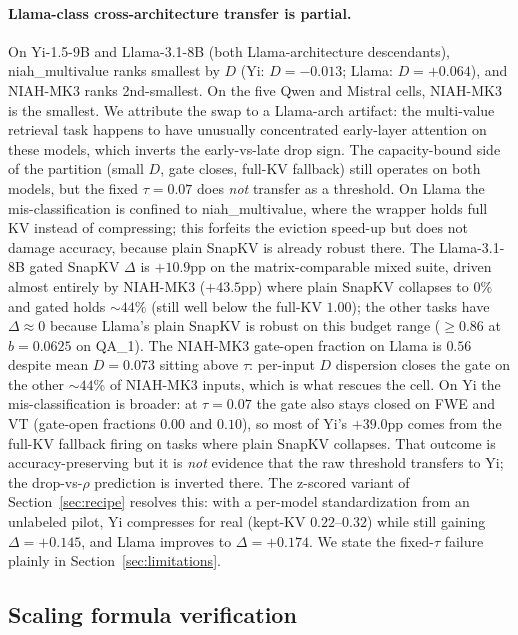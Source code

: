 \documentclass{article}
\begin{document}
\paragraph{Llama-class cross-architecture transfer is partial.} On
Yi-1.5-9B and Llama-3.1-8B (both Llama-architecture descendants),
niah\_multivalue ranks smallest by $D$ (Yi: $D = -0.013$; Llama: $D =
+0.064$), and NIAH-MK3 ranks 2nd-smallest. On the five Qwen and
Mistral cells, NIAH-MK3 is the smallest. We attribute the swap to a
Llama-arch artifact: the multi-value retrieval task happens to have
unusually concentrated early-layer attention on these models, which
inverts the early-vs-late drop sign. The capacity-bound side of the
partition (small $D$, gate closes, full-KV fallback) still operates on
both models, but the fixed $\tau = 0.07$ does \emph{not} transfer as a
threshold. On Llama the mis-classification is confined to
niah\_multivalue, where the wrapper holds full KV instead of
compressing; this forfeits the eviction speed-up but does not damage
accuracy, because plain SnapKV is already robust there. The
Llama-3.1-8B gated SnapKV $\Delta$ is $+10.9$pp on the
matrix-comparable mixed suite, driven almost entirely by NIAH-MK3
($+43.5$pp) where plain SnapKV collapses to $0\%$ and gated holds
$\sim 44\%$ (still well below the full-KV $1.00$); the other tasks
have $\Delta \approx 0$ because Llama's plain SnapKV is robust on this
budget range ($\geq 0.86$ at $b = 0.0625$ on QA\_1). The NIAH-MK3
gate-open fraction on Llama is $0.56$ despite mean $D = 0.073$ sitting
above $\tau$: per-input $D$ dispersion closes the gate on the other
$\sim 44\%$ of NIAH-MK3 inputs, which is what rescues the cell. On Yi
the mis-classification is broader: at $\tau = 0.07$ the gate also
stays closed on FWE and VT (gate-open fractions $0.00$ and $0.10$), so
most of Yi's $+39.0$pp comes from the full-KV fallback firing on tasks
where plain SnapKV collapses. That outcome is accuracy-preserving but
it is \emph{not} evidence that the raw threshold transfers to Yi; the
drop-vs-$\rho$ prediction is inverted there. The z-scored variant of
Section~\ref{sec:recipe} resolves this: with a per-model standardization
from an unlabeled pilot, Yi compresses for real (kept-KV
$0.22$--$0.32$) while still gaining $\Delta = +0.145$, and Llama
improves to $\Delta = +0.174$. We state the fixed-$\tau$ failure
plainly in Section~\ref{sec:limitations}.

\subsection{Scaling formula verification}
\end{document}
